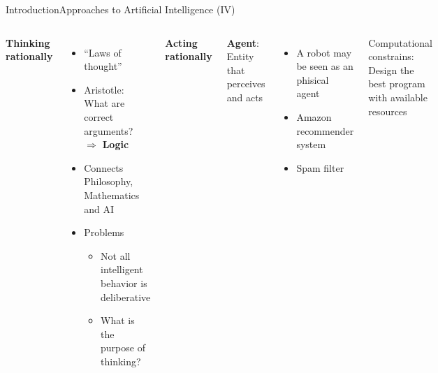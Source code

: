 \documentclass[10pt,compress]{beamer} %
\begin{document}
\begin{frame}{Introduction}{Approaches to Artificial Intelligence (IV)}
	\begin{columns}
	   \begin{center}
	   		\textbf{Thinking rationally}
	   \end{center}

	   \begin{itemize}
	   \item ``Laws of thought''
	   \item Aristotle: What are correct arguments? $\Rightarrow$ \textbf{Logic}
	   \item Connects Philosophy, Mathematics and AI
	   \item Problems
	   		\begin{itemize}
	   		\item Not all intelligent behavior is deliberative
	   		\item What is the purpose of thinking?
	   		\end{itemize}
	   \end{itemize}
	   
	   	\begin{center}
	   		\textbf{Acting rationally}
	   	\end{center}
	   	\textbf{Agent}: Entity that perceives and acts
		\begin{itemize}
			\item A robot may be seen as an phisical agent
			\item Amazon recommender system
			\item Spam filter
		\end{itemize}
		Computational constrains: Design the best program with available resources
	\end{columns}
\end{frame}
\end{document}
